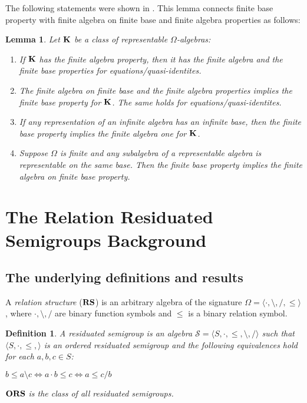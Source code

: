 \documentclass[a4paper]{article}
\theoremstyle{defin}
\newtheorem{defin}{Definition}
\theoremstyle{theorem}
\theoremstyle{prop}
\theoremstyle{lemma}
\newtheorem{lemma}{Lemma}
\theoremstyle{ex}
\theoremstyle{col}
\begin{document}
The following statements were shown in \cite{andreka1999finite}. This lemma connects finite base property with finite algebra on finite base and finite algebra properties as follows:
\begin{lemma}
  Let ${\bf K}$ be a class of representable $\Omega$-algebras:
  \begin{enumerate}
    \item If ${\bf K}$ has the finite algebra property, then it has the finite algebra and the finite base properties for equations/quasi-identites.
    \item The finite algebra on finite base and the finite algebra properties implies the finite base property for ${\bf K}$. The same holds for equations/quasi-identites.
    \item If any representation of an infinite algebra has an infinite base, then the finite base property implies the finite algebra one for ${\bf K}$.
    \item Suppose $\Omega$ is finite and any subalgebra of a representable algebra is representable on the same base. Then the finite base property implies the finite algebra on finite base property.
  \end{enumerate}
\end{lemma}

\section{The Relation Residuated Semigroups Background}

\subsection{The underlying definitions and results}

 A \emph{relation structure} (${\bf RS}$) is an arbitrary algebra of the signature $\Omega = \langle \cdot, \setminus, /, \leq \rangle$, where $\cdot, \setminus, /$ are binary function symbols and $\leq$ is a binary relation symbol.

\begin{defin}
  A residuated semigroup is an algebra $\mathcal{S} = \langle S, \cdot, \leq, \setminus, / \rangle$ such that $\langle S, \cdot, \leq, \rangle$ is an ordered residuated semigroup and the following equivalences hold for each $a, b, c \in S$:

  \begin{center}
    $b \leq a \setminus c \Leftrightarrow a \cdot b \leq c \Leftrightarrow a \leq c / b$
  \end{center}
  ${\bf ORS}$ is the class of all residuated semigroups.
\end{defin}
\end{document}
